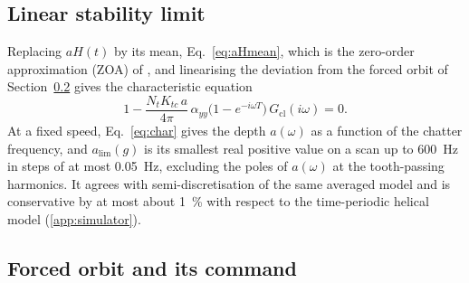\subsection{Linear stability limit}\label{sec:model-zoa}

Replacing $aH(t)$ by its mean, Eq.~\eqref{eq:aHmean}, which is the zero-order approximation (ZOA) of \citet{altintas1995analytical}, and linearising the deviation from the forced orbit of Section~\ref{sec:model-orbit} gives the characteristic equation
\begin{equation}\label{eq:char}
  1-\frac{N_tK_{tc}\,a}{4\pi}\,\alpha_{yy}\bigl(1-e^{-i\omega T}\bigr)\,G_{\mathrm{cl}}(i\omega)=0 .
\end{equation}
At a fixed speed, Eq.~\eqref{eq:char} gives the depth $a(\omega)$ as a function of the chatter frequency, and $a_{\lim}(g)$ is its smallest real positive value on a scan up to \SI{600}{\hertz} in steps of at most \SI{0.05}{\hertz}, excluding the poles of $a(\omega)$ at the tooth-passing harmonics. It agrees with semi-discretisation of the same averaged model and is conservative by at most about \SI{1}{\percent} with respect to the time-periodic helical model (\ref{app:simulator}).

\subsection{Forced orbit and its command}\label{sec:model-orbit}


